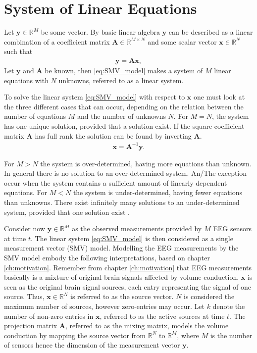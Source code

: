 \section{System of Linear Equations}\label{sec:SMV}
Let $\mathbf{y} \in \mathbb{R}^M$ be some vector. By basic linear algebra $\mathbf{y}$ can be described as a linear combination of a coefficient matrix $\mathbf{A} \in \mathbb{R}^{M \times N}$ and some scalar vector $\mathbf{x} \in \mathbb{R}^N$ such that
\begin{align}\label{eq:SMV_model}
\mathbf{y} = \mathbf{Ax},
\end{align}
Let $\mathbf{y}$ and $\mathbf{A}$ be known, then  
\ref{eq:SMV_model} makes a system of $M$ linear equations with $N$ unknowns, referred to as a linear system. 

To solve the linear system \ref{eq:SMV_model} with respect to $\textbf{x}$ one must look at the three different cases that can occur, depending on the relation between the number of equations $M$ and the number of unknowns $N$.
For $M = N$, the system has one unique solution, provided that a solution exist.  
If the square coefficient matrix $\mathbf{A}$ has full rank the solution can be found by inverting $\mathbf{A}$.
\begin{align*}
\mathbf{x} = \mathbf{A}^{-1} \mathbf{y}.
\end{align*}

For $M > N$ the system is over-determined, having more equations than unknown. In general there is no solution to an over-determined system. An/The exception occur when the system contains a sufficient amount of linearly dependent equations.    
For $M < N$ the system is under-determined, having fewer equations than unknowns. There exist infinitely many solutions to an under-determined system, provided that one solution exist \cite[p. ix]{CS}.  

Consider now $\mathbf{y} \in \mathbb{R}^M$ as the observed measurements provided by $M$ EEG sensors at time $t$. 
The linear system \ref{eq:SMV_model} is then considered as a single measurement vector (SMV) model.  
Modelling the EEG measurements by the SMV model embody the following interpretations, based on chapter \ref{ch:motivation}.
Remember from chapter \ref{ch:motivation} that EEG measurements basically is a mixture of original brain signals affected by volume conduction.
$\textbf{x}$ is seen as the original brain signal sources, each entry representing the signal of one source. 
Thus, $\textbf{x}\in \mathbb{R}^N$ is referred to as the source vector. $N$ is considered the maximum number of sources, however zero-entries may occur. Let $k$ denote the number of non-zero entries in $\textbf{x}$, referred to as the active sources at time $t$.   
The projection matrix $\textbf{A}$, referred to as the mixing matrix, models the volume conduction by mapping the source vector from $\mathbb{R}^N$ to $\mathbb{R}^M$, where $M$ is the number of sensors hence the dimension of the measurement vector $\textbf{y}$.             


